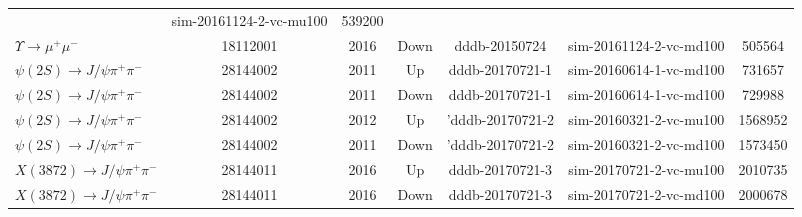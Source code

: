 \begin{table}[htb!]
\begin{center}
{\begin{tabular}{l|c|c|c|c|c|c}
                                            & sim-20161124-2-vc-mu100
                                                      &  539200 \\
$\Upsilon \rightarrow \mu^+ \mu^-$ & 18112001 & 2016 & Down & dddb-20150724
                                                                   
                                            &  sim-20161124-2-vc-md100
                                                      & 505564 \\

$\psi(2S) \rightarrow J/\psi \pi^+ \pi^-$  &  28144002 & 2011 & Up &
                                                                   
                                  dddb-20170721-1          & sim-20160614-1-vc-md100
                                                      & 731657 \\
$\psi(2S) \rightarrow J/\psi \pi^+ \pi^-$  &  28144002  & 2011 & Down
                                    &  dddb-20170721-1 
                                                                   
                                            & sim-20160614-1-vc-md100
                                                      & 729988  \\
$\psi(2S) \rightarrow J/\psi \pi^+ \pi^-$  &  28144002 & 2012 & Up &
                                                                   
                     'dddb-20170721-2                       & sim-20160321-2-vc-mu100
                                                      & 1568952 \\
$\psi(2S) \rightarrow J/\psi \pi^+ \pi^-$  & 28144002 & 2011 & Down &
                                                                   
                    'dddb-20170721-2                        & sim-20160321-2-vc-md100
                                                      &  1573450 \\


$X(3872) \rightarrow J/\psi \pi^+ \pi^-$  & 28144011 & 2016 & Up &
                                                                   
                                 dddb-20170721-3           & sim-20170721-2-vc-mu100
                                                      &  2010735\\
$X(3872) \rightarrow J/\psi \pi^+ \pi^-$  & 28144011 & 2016 & Down &
                                       dddb-20170721-3                            
                                            & sim-20170721-2-vc-md100
                                                      &  2000678 \\


\end{tabular}}
\end{center}
\label{tab:mc}
\end{table}

